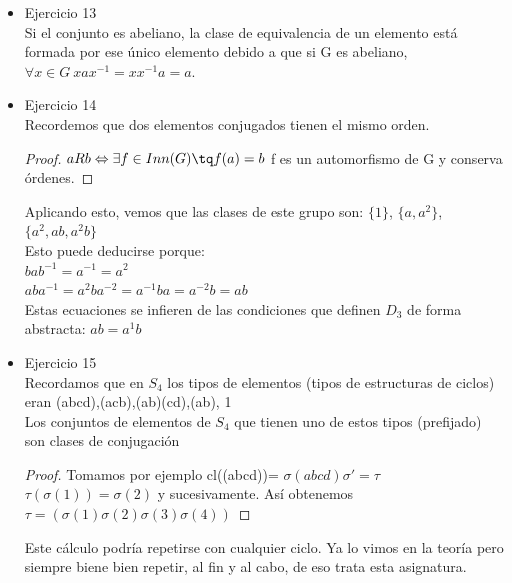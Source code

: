 \documentclass{apuntes}
\begin{document}
\begin{itemize}
 \item Ejercicio 13\\
 Si el conjunto es abeliano, la clase de equivalencia de un elemento está formada por ese único elemento debido a que si G es abeliano,
 $\forall x \in G \ xax^{-1}=xx^{-1}a=a$.\
 
 \item Ejercicio 14\\
 Recordemos que dos elementos conjugados tienen el mismo orden.
 \begin{proof}
  $aRb \Leftrightarrow \exists f \in Inn(G) \tq f(a)=b$  f es un automorfismo de G y conserva órdenes.
 \end{proof}
 Aplicando esto, vemos que las clases de este grupo son: $\{1\}$, $\{a, a^{2}\}$, $\{a^{2}, ab, a^{2}b\}$\\
 Esto puede deducirse porque:\\
 $bab^{-1}=a^{-1}=a^{2}$\\
 $aba^{-1}=a^{2}ba^{-2}=a^{-1}ba=a^{-2}b=ab$\\
 Estas ecuaciones se infieren de las condiciones que definen $D_3$ de forma abstracta: $ab=a^{1}b$\\
 
 \item Ejercicio 15\\
 Recordamos que en $S_4$  los tipos de elementos (tipos de estructuras de ciclos) eran (abcd),(acb),(ab)(cd),(ab), 1\\
 Los conjuntos de elementos de $S_4$  que tienen uno de estos tipos (prefijado) son clases de conjugación\\
 \begin{proof}
  Tomamos por ejemplo cl((abcd))= $\sigma (abcd) \sigma'= \tau$\\
  $\tau(\sigma(1))=\sigma(2)$  y sucesivamente. Así obtenemos
  $\tau = (\sigma(1)\sigma(2)\sigma(3)\sigma(4))$
 \end{proof}

 Este cálculo podría repetirse con cualquier ciclo. Ya lo vimos en la teoría pero siempre biene bien repetir, al fin y al cabo, de
 eso trata esta asignatura.
\end{itemize}



\newpage
\printindex
\end{document}

